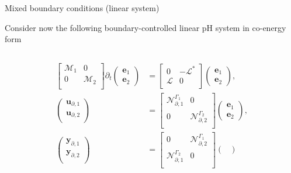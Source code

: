 \documentclass[aspectratio=169]{ISAE-Beamer}
\begin{document}
\begin{frame}{Mixed boundary conditions (linear system)}
	
	Consider now the following boundary-controlled linear pH system in co-energy form 
	\begin{columns}
		\begin{column}{0.6\textwidth}
			\begin{align*}
				\begin{bmatrix}
					\mathcal{M}_1 & 0 \\
					0 & \mathcal{M}_2 \\
				\end{bmatrix}
				\partial_t \begin{pmatrix}
					\bm{e}_1 \\ \bm{e}_2
				\end{pmatrix} &= \begin{bmatrix}
					0 &- \mathcal{L}^* \\
					\mathcal{L} & 0 \\
				\end{bmatrix}\begin{pmatrix}
					\bm{e}_1 \\ \bm{e}_2
				\end{pmatrix}, \\
				\begin{pmatrix}
					\bm{u}_{\partial, 1}\\
					\bm{u}_{\partial, 2}\\
				\end{pmatrix} &= \begin{bmatrix}
					\mathcal{N}_{\partial, 1}^{\Gamma_1} & 0\\
					0 & \mathcal{N}_{\partial, 2}^{\Gamma_2} \\
				\end{bmatrix} \begin{pmatrix}
					\bm{e}_1 \\ \bm{e}_2
				\end{pmatrix}, \\
				\begin{pmatrix}
					\bm{y}_{\partial, 1}\\
					\bm{y}_{\partial, 2}\\
				\end{pmatrix} &= \begin{bmatrix}
					0 & \mathcal{N}_{\partial, 2}^{\Gamma_1} \\
					\mathcal{N}_{\partial, 1}^{\Gamma_2} & 0\\
				\end{bmatrix} \begin{pmatrix}

\end{pmatrix}
\end{align*}
\end{column}
\end{columns}
\end{frame}
\end{document}
